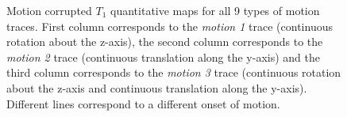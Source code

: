\begin{figure}[ht]
    \caption{Motion corrupted $T_1$ quantitative maps for all 9 types of motion traces. First column corresponds to the \textit{motion 1} trace (continuous rotation about the z-axis), the second column corresponds to the \textit{motion 2} trace (continuous translation along the y-axis) and the third column corresponds to the \textit{motion 3} trace (continuous rotation about the z-axis and continuous translation along the y-axis). Different lines correspond to a different onset of motion.}
    \label{fig:T1mapsmotion}
\end{figure}


